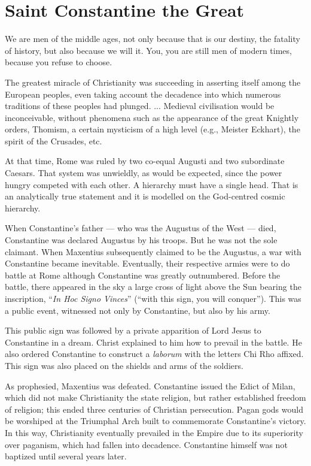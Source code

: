 \section{Saint Constantine the Great}

\begin{quotex}
We are men of the middle ages, not only because that is our destiny, the fatality of history, but also because we will it. You, you are still men of modern times, because you refuse to choose.

The greatest miracle of Christianity was succeeding in asserting itself among the European peoples, even taking account the decadence into which numerous traditions of these peoples had plunged. ... Medieval civilisation would be inconceivable, without phenomena such as the appearance of the great Knightly orders, Thomism, a certain mysticism of a high level (e.g., Meister Eckhart), the spirit of the Crusades, etc.
\end{quotex}

At that time, Rome was ruled by two co-equal Augusti and two subordinate Caesars. That system was unwieldly, as would be expected, since the power hungry competed with each other. A hierarchy must have a single head. That is an analytically true statement and it is modelled on the God-centred cosmic hierarchy.

When Constantine's father --- who was the Augustus of the West --- died, Constantine was declared Augustus by his troops. But he was not the sole claimant. When Maxentius subsequently claimed to be the Augustus, a war with Constantine became inevitable. Eventually, their respective armies were to do battle at Rome although Constantine was greatly outnumbered. Before the battle, there appeared in the sky a large cross of light above the Sun bearing the inscription, ``\emph{In Hoc Signo Vinces}'' (``with this sign, you will conquer''). This was a public event, witnessed not only by Constantine, but also by his army.

This public sign was followed by a private apparition of Lord Jesus to Constantine in a dream. Christ explained to him how to prevail in the battle. He also ordered Constantine to construct a \emph{laborum} with the letters Chi Rho affixed. This sign was also placed on the shields and arms of the soldiers.

As prophesied, Maxentius was defeated. Constantine issued the Edict of Milan, which did not make Christianity the state religion, but rather established freedom of religion; this ended three centuries of Christian persecution. Pagan gods would be worshiped at the Triumphal Arch built to commemorate Constantine's victory. In this way, Christianity eventually prevailed in the Empire due to its superiority over paganism, which had fallen into decadence. Constantine himself was not baptized until several years later.

